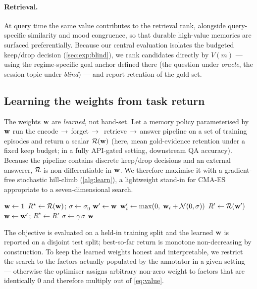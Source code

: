 \paragraph{Retrieval.}
At query time the same value contributes to the retrieval rank,
alongside query-specific similarity and mood congruence, so that durable
high-value memories are surfaced preferentially. Because our central
evaluation isolates the budgeted keep/drop decision
(\cref{sec:exp:blind}), we rank candidates directly by $V(m)$ --- using
the regime-specific goal anchor defined there (the question under
\emph{oracle}, the session topic under \emph{blind}) --- and report
retention of the gold set.

\subsection{Learning the weights from task return}
\label{sec:method:learn}

The weights $\mathbf{w}$ are \emph{learned}, not hand-set. Let a memory policy
parameterised by $\mathbf{w}$ run the
encode\,$\rightarrow$\,\allowbreak forget\,$\rightarrow$\,\allowbreak
retrieve\,$\rightarrow$\,\allowbreak answer
pipeline on a set of training episodes and return a scalar
$\mathcal{R}(\mathbf{w})$ (here, mean gold-evidence retention under a fixed keep
budget; in a fully API-gated setting, downstream QA accuracy). Because
the pipeline contains discrete keep/drop decisions and an external
answerer, $\mathcal{R}$ is non-differentiable in $\mathbf{w}$. We therefore
maximise it with a gradient-free stochastic hill-climb
(\cref{alg:learn}), a lightweight stand-in for CMA-ES
\citep{hansen2016cmaes} appropriate to a seven-dimensional search.

\begin{algorithm}[ht!]
\small
\caption{Gradient-free weight learning (A2).}
\label{alg:learn}
\begin{algorithmic}[1]
\State $\mathbf{w} \gets \mathbf{1}$ 
\State $R^\star \gets \mathcal{R}(\mathbf{w})$; \; $\sigma \gets \sigma_0$
  \State $\mathbf{w}' \gets \mathbf{w}$
      $\mathbf{w}'_i \gets \max(0,\; \mathbf{w}_i + \mathcal{N}(0,\sigma))$
    \EndIf
  \EndFor
  \State $R' \gets \mathcal{R}(\mathbf{w}')$
   $\mathbf{w} \gets \mathbf{w}'$; \; $R^\star \gets R'$ \EndIf
  \State $\sigma \gets \gamma\,\sigma$ 
\EndFor
\State \Return $\mathbf{w}$
\end{algorithmic}
\end{algorithm}

The objective is evaluated on a held-in training split and the learned
$\mathbf{w}$ is reported on a disjoint test split; best-so-far return is
monotone non-decreasing by construction. To keep the learned weights
honest and interpretable, we restrict the search to the factors actually
populated by the annotator in a given setting --- otherwise the
optimiser assigns arbitrary non-zero weight to factors that are
identically $0$ and therefore multiply out of \cref{eq:value}.
